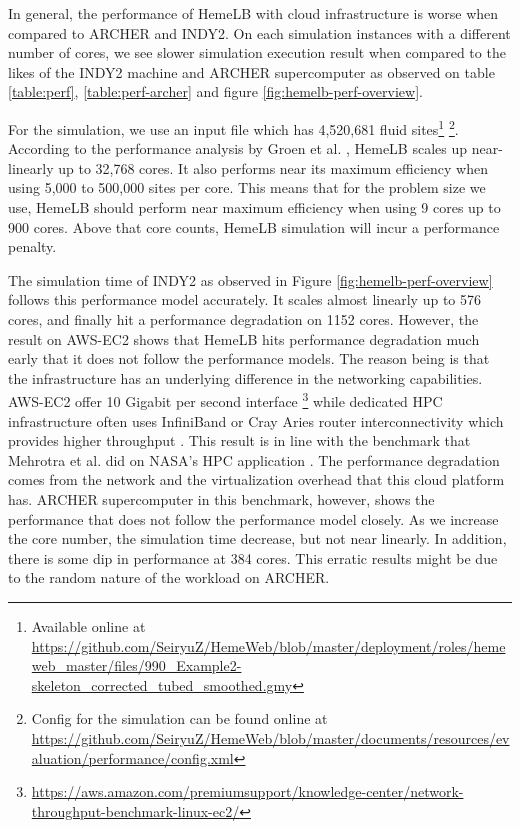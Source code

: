 \vspace{0.5cm}


In general, the performance of HemeLB with cloud infrastructure is worse when compared to ARCHER and INDY2. On each simulation instances with a different number of cores, we see slower simulation execution result when compared to the likes of the INDY2 machine and ARCHER supercomputer as observed on table \ref{table:perf}, \ref{table:perf-archer} and figure \ref{fig:hemelb-perf-overview}.

For the simulation, we use an input file which has 4,520,681 fluid sites\footnote{Available online at \url{https://github.com/SeiryuZ/HemeWeb/blob/master/deployment/roles/hemeweb_master/files/990_Example2-skeleton_corrected_tubed_smoothed.gmy}}  \footnote{Config for the simulation can be found online at \url{https://github.com/SeiryuZ/HemeWeb/blob/master/documents/resources/evaluation/performance/config.xml}}. According to the performance analysis by Groen et al. \citep{groen2013analysing}, HemeLB scales up near-linearly up to 32,768 cores. It also performs near its maximum efficiency when using 5,000 to 500,000 sites per core. This means that for the problem size we use, HemeLB should perform near maximum efficiency when using 9 cores up to 900 cores. Above that core counts, HemeLB simulation will incur a performance penalty.

The simulation time of INDY2 as observed in Figure \ref{fig:hemelb-perf-overview} follows this performance model accurately. It scales almost linearly up to 576 cores, and finally hit a performance degradation on 1152 cores. However, the result on AWS-EC2 shows that HemeLB hits performance degradation much early that it does not follow the performance models. The reason being is that the infrastructure has an underlying difference in the networking capabilities. AWS-EC2 offer 10 Gigabit per second interface \footnote{\url{https://aws.amazon.com/premiumsupport/knowledge-center/network-throughput-benchmark-linux-ec2/}} while dedicated HPC infrastructure often uses InfiniBand or Cray Aries router interconnectivity which provides higher throughput \cite{Quan:2014aa}. This result is in line with the benchmark that Mehrotra et al. did on NASA's HPC application \citep{mehrotra2012performance}. The performance degradation comes from the network and the virtualization overhead that this cloud platform has.  ARCHER supercomputer in this benchmark, however, shows the performance that does not follow the performance model closely. As we increase the core number, the simulation time decrease, but not near linearly. In addition, there is some dip in performance at 384 cores. This erratic results might be due to the random nature of the workload on ARCHER. 

